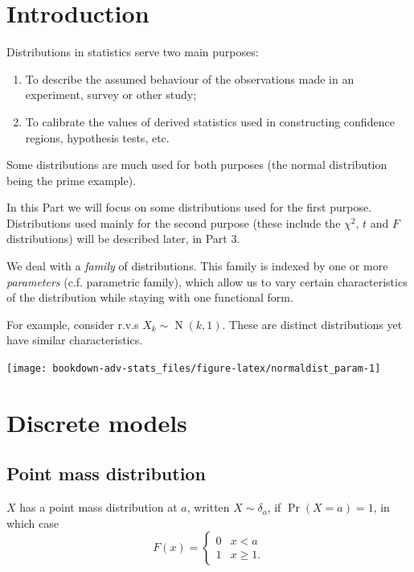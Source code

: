 \documentclass[
]{book}
\providecommand{\tightlist}{%
  \setlength{\itemsep}{0pt}\setlength{\parskip}{0pt}}
\DeclareMathOperator{\N}{N}
\theoremstyle{definition}
\theoremstyle{definition}
\theoremstyle{definition}
\theoremstyle{definition}
\theoremstyle{remark}
\begin{document}
\hypertarget{introduction}{%
\section{Introduction}\label{introduction}}

Distributions in statistics serve two main purposes:

\begin{enumerate}
\def\labelenumi{\arabic{enumi}.}
\tightlist
\item
  To describe the assumed behaviour of the observations made in an experiment, survey or other study;
\item
  To calibrate the values of derived statistics used in constructing confidence regions, hypothesis tests, etc.
\end{enumerate}

Some distributions are much used for both purposes (the normal distribution being the prime example).

In this Part we will focus on some distributions used for the first purpose.
Distributions used mainly for the second purpose (these include the \(\chi^2\), \(t\) and \(F\) distributions) will be described later, in Part 3.

We deal with a \emph{family} of distributions.
This family is indexed by one or more \emph{parameters} (c.f. parametric family), which allow us to vary certain characteristics of the distribution while staying with one functional form.

For example, consider r.v.s \(X_k\sim\N(k,1)\).
These are distinct distributions yet have similar characteristics.

\begin{center}\texttt{[image: bookdown-adv-stats\_files/figure-latex/normaldist\_param-1]} \end{center}

\hypertarget{discrete-models}{%
\section{Discrete models}\label{discrete-models}}

\hypertarget{point-mass-distribution}{%
\subsection{Point mass distribution}\label{point-mass-distribution}}

\(X\) has a point mass distribution at \(a\), written \(X\sim \delta_a\), if \(\Pr(X=a) = 1\), in which case
\[
F(x) = \begin{cases}
0 &x<a \\
1 &x\geq 1.
\end{cases}
\]
\end{document}
